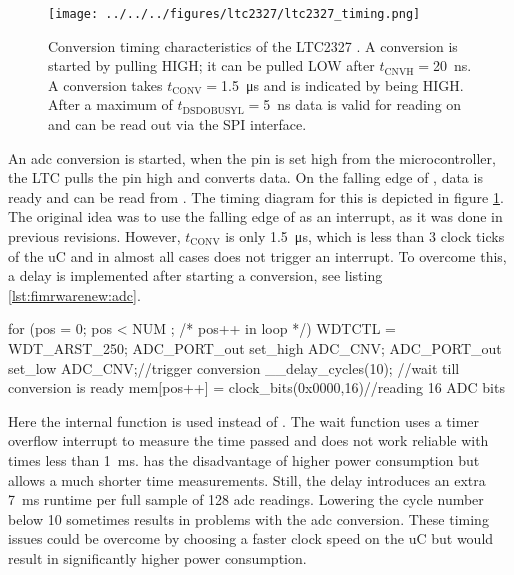 \begin{figure}
	\centering
	\texttt{[image: ../../../figures/ltc2327/ltc2327\_timing.png]}
	\caption{Conversion timing characteristics of the LTC2327 \cite{LTC2327}. A conversion is started by pulling  HIGH; it can be pulled LOW after $t_\text{CNVH}=$\SI{20}{\nano\second}. A conversion takes $t_\text{CONV}=$\SI{1.5}{\micro\second} and is indicated by  being HIGH. After a maximum of $t_\text{DSDOBUSYL}=$\SI{5}{\nano\second} data is valid for reading on  and can be read out via the SPI interface.}
	\label{fig:ltc2327:timing}
\end{figure} 
An \ac{adc} conversion is started, when the  pin is set high from the microcontroller, the LTC pulls the  pin high and converts data. On the falling edge of , data is ready and can be read from . The timing diagram for this is depicted in figure \ref{fig:ltc2327:timing}. The original idea was to use the falling edge of  as an interrupt, as it was done in previous revisions. However, $t_\text{CONV}$ is only \SI{1.5}{\micro\second}, which is less than 3 clock ticks of the \ac{uC} and in almost all cases does not trigger an interrupt. To overcome this, a delay is implemented after starting a conversion, see listing \ref{lst:fimrwarenew:adc}.
\begin{codecpp}[caption={\ac{adc} conversion loop for taking 128 samples.\label{lst:fimrwarenew:adc}}]
for (pos = 0; pos < NUM ; /* pos++ in loop */) {
	WDTCTL = WDT_ARST_250;
	ADC_PORT_out set_high ADC_CNV;
	ADC_PORT_out set_low ADC_CNV;//trigger conversion
	__delay_cycles(10); //wait till conversion is ready
	mem[pos++] = clock_bits(0x0000,16)//reading 16 ADC bits 
	}
\end{codecpp} 
Here the internal function  is used instead of . The wait function uses a timer overflow interrupt to measure the time passed and does not work reliable with times less than \SI{1}{\milli\second}.  has the disadvantage of higher power consumption but allows a much shorter time measurements. Still, the delay introduces an extra \SI{7}{\milli\second} runtime per full sample of 128 \ac{adc} readings. Lowering the cycle number below 10 sometimes results in problems with the \ac{adc} conversion. These timing issues could be overcome by choosing a faster clock speed on the \ac{uC} but would result in significantly higher power consumption. 
